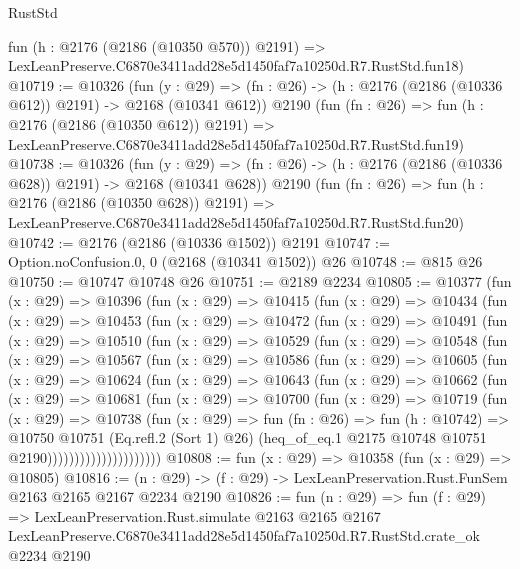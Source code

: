 \begin{lexlean}{RustStd}
\begin{coremodule}
    fun (h : @2176 (@2186 (@10350 @570)) @2191) =>
    LexLeanPreserve.C6870e3411add28e5d1450faf7a10250d.R7.RustStd.fun18)
@10719 := @10326
    (fun (y : @29) => (fn : @26) -> (h : @2176 (@2186 (@10336 @612)) @2191) -> @2168 (@10341 @612))
    @2190
    (fun (fn : @26) =>
    fun (h : @2176 (@2186 (@10350 @612)) @2191) =>
    LexLeanPreserve.C6870e3411add28e5d1450faf7a10250d.R7.RustStd.fun19)
@10738 := @10326
    (fun (y : @29) => (fn : @26) -> (h : @2176 (@2186 (@10336 @628)) @2191) -> @2168 (@10341 @628))
    @2190
    (fun (fn : @26) =>
    fun (h : @2176 (@2186 (@10350 @628)) @2191) =>
    LexLeanPreserve.C6870e3411add28e5d1450faf7a10250d.R7.RustStd.fun20)
@10742 := @2176 (@2186 (@10336 @1502)) @2191
@10747 := Option.noConfusion.{0, 0} (@2168 (@10341 @1502)) @26
@10748 := @815 @26
@10750 := @10747 @10748 @26
@10751 := @2189 @2234
@10805 := @10377
    (fun (x : @29) =>
    @10396
      (fun (x : @29) =>
      @10415
        (fun (x : @29) =>
        @10434
          (fun (x : @29) =>
          @10453
            (fun (x : @29) =>
            @10472
              (fun (x : @29) =>
              @10491
                (fun (x : @29) =>
                @10510
                  (fun (x : @29) =>
                  @10529
                    (fun (x : @29) =>
                    @10548
                      (fun (x : @29) =>
                      @10567
                        (fun (x : @29) =>
                        @10586
                          (fun (x : @29) =>
                          @10605
                            (fun (x : @29) =>
                            @10624
                              (fun (x : @29) =>
                              @10643
                                (fun (x : @29) =>
                                @10662
                                  (fun (x : @29) =>
                                  @10681
                                    (fun (x : @29) =>
                                    @10700
                                      (fun (x : @29) =>
                                      @10719
                                        (fun (x : @29) =>
                                        @10738
                                          (fun (x : @29) =>
                                          fun (fn : @26) =>
                                          fun (h : @10742) =>
                                          @10750
                                            @10751
                                            (Eq.refl.{2} (Sort 1) @26)
                                            (heq_of_eq.{1}
                                              @2175
                                              @10748
                                              @10751
                                              @2190)))))))))))))))))))))
@10808 := fun (x : @29) => @10358 (fun (x : @29) => @10805)
@10816 := (n : @29) -> (f : @29) -> LexLeanPreservation.Rust.FunSem @2163 @2165 @2167 @2234 @2190
@10826 := fun (n : @29) =>
  fun (f : @29) =>
  LexLeanPreservation.Rust.simulate
    @2163
    @2165
    @2167
    LexLeanPreserve.C6870e3411add28e5d1450faf7a10250d.R7.RustStd.crate_ok
    @2234
    @2190
\end{coremodule}
\end{lexlean}
